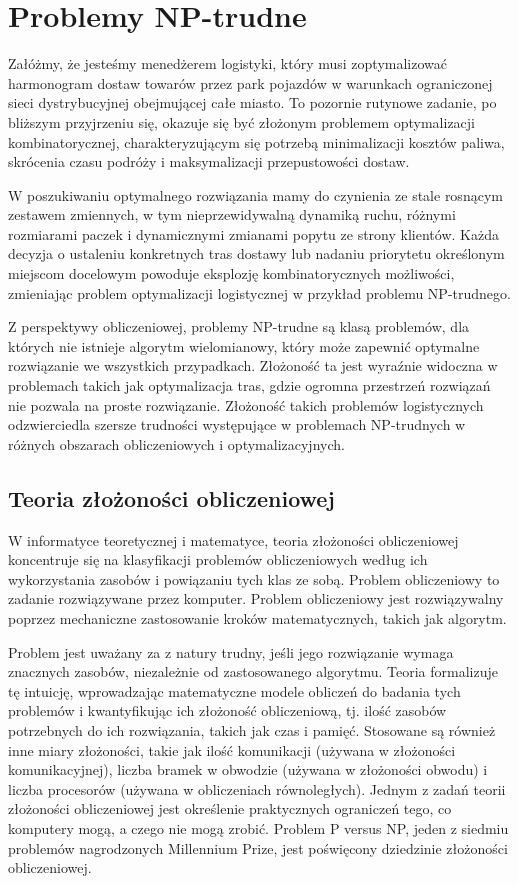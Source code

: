 \chapter{Problemy NP-trudne}

Załóżmy, że jesteśmy menedżerem logistyki, który musi zoptymalizować harmonogram dostaw towarów przez park pojazdów w warunkach ograniczonej sieci dystrybucyjnej obejmującej całe miasto. To pozornie rutynowe zadanie, po bliższym przyjrzeniu się, okazuje się być złożonym problemem optymalizacji kombinatorycznej, charakteryzującym się potrzebą minimalizacji kosztów paliwa, skrócenia czasu podróży i maksymalizacji przepustowości dostaw.

W poszukiwaniu optymalnego rozwiązania mamy do czynienia ze stale rosnącym zestawem zmiennych, w tym nieprzewidywalną dynamiką ruchu, różnymi rozmiarami paczek i dynamicznymi zmianami popytu ze strony klientów. Każda decyzja o ustaleniu konkretnych tras dostawy lub nadaniu priorytetu określonym miejscom docelowym powoduje eksplozję kombinatorycznych możliwości, zmieniając problem optymalizacji logistycznej w przykład problemu NP-trudnego.

Z perspektywy obliczeniowej, problemy NP-trudne są klasą problemów, dla których nie istnieje algorytm wielomianowy, który może zapewnić optymalne rozwiązanie we wszystkich przypadkach. Złożoność ta jest wyraźnie widoczna w problemach takich jak optymalizacja tras, gdzie ogromna przestrzeń rozwiązań nie pozwala na proste rozwiązanie. Złożoność takich problemów logistycznych odzwierciedla szersze trudności występujące w problemach NP-trudnych w różnych obszarach obliczeniowych i optymalizacyjnych.


\section{Teoria złożoności obliczeniowej}

W informatyce teoretycznej i matematyce, teoria złożoności obliczeniowej koncentruje się na klasyfikacji problemów obliczeniowych według ich wykorzystania zasobów i powiązaniu tych klas ze sobą. Problem obliczeniowy to zadanie rozwiązywane przez komputer. Problem obliczeniowy jest rozwiązywalny poprzez mechaniczne zastosowanie kroków matematycznych, takich jak algorytm.

Problem jest uważany za z natury trudny, jeśli jego rozwiązanie wymaga znacznych zasobów, niezależnie od zastosowanego algorytmu. Teoria formalizuje tę intuicję, wprowadzając matematyczne modele obliczeń do badania tych problemów i kwantyfikując ich złożoność obliczeniową, tj. ilość zasobów potrzebnych do ich rozwiązania, takich jak czas i pamięć. Stosowane są również inne miary złożoności, takie jak ilość komunikacji (używana w złożoności komunikacyjnej), liczba bramek w obwodzie (używana w złożoności obwodu) i liczba procesorów (używana w obliczeniach równoległych). Jednym z zadań teorii złożoności obliczeniowej jest określenie praktycznych ograniczeń tego, co komputery mogą, a czego nie mogą zrobić. Problem P versus NP, jeden z siedmiu problemów nagrodzonych Millennium Prize, jest poświęcony dziedzinie złożoności obliczeniowej.

